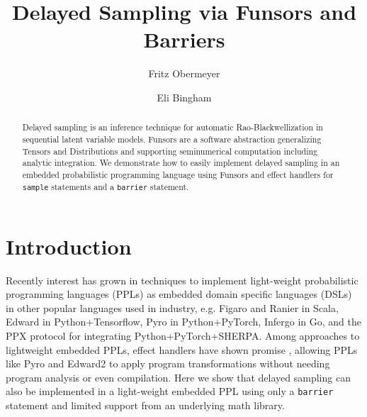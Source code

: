 \documentclass[anonymous=false, %
               format=acmsmall, %
               review=true, %
               screen=true, %
               nonacm=true]{acmart}
\begin{document}
\title{Delayed Sampling via Funsors and Barriers}

\author{Fritz Obermeyer}

\author{Eli Bingham}

\begin{abstract}
Delayed sampling is an inference technique for automatic Rao-Blackwellization in sequential latent variable models.
Funsors are a software abstraction generalizing Tensors and Distributions and supporting seminumerical computation including analytic integration.
We demonstrate how to easily implement delayed sampling in an embedded probabilistic programming language using Funsors and effect handlers for \texttt{sample} statements and a \texttt{barrier} statement.
\end{abstract}

\maketitle

\section{Introduction}

Recently interest has grown in techniques to implement light-weight probabilistic programming languages (PPLs) as embedded domain specific languages (DSLs) in other popular languages used in industry, e.g. Figaro \cite{pfeffer2009figaro} and Ranier \cite{bryant2018ranier} in Scala, Edward \cite{tran2017deep} in Python+Tensorflow, Pyro \cite{bingham2018pyro} in Python+PyTorch, Infergo \cite{tolpin2019deployable} in Go, and the PPX protocol \cite{baydin2019efficient} for integrating Python+PyTorch+SHERPA.
Among approaches to lightweight embedded PPLs, effect handlers have shown promise \cite{moore2018effect,pretnar2015introduction}, allowing PPLs like Pyro and Edward2 \cite{tran2018simple} to apply program transformations without needing program analysis or even compilation.
Here we show that delayed sampling can also be implemented in a light-weight embedded PPL using only a \verb$barrier$ statement and limited support from an underlying math library.
\end{document}
